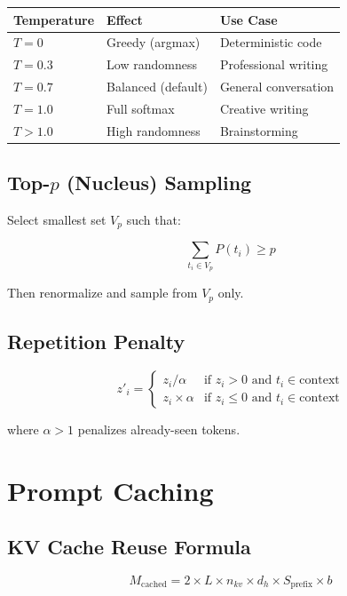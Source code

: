 \documentclass[11pt,a4paper]{article}
\begin{document}
\begin{center}
\begin{tabular}{lll}
\toprule
\textbf{Temperature} & \textbf{Effect} & \textbf{Use Case} \\
\midrule
$T = 0$ & Greedy (argmax) & Deterministic code \\
$T = 0.3$ & Low randomness & Professional writing \\
$T = 0.7$ & Balanced (default) & General conversation \\
$T = 1.0$ & Full softmax & Creative writing \\
$T > 1.0$ & High randomness & Brainstorming \\
\bottomrule
\end{tabular}
\end{center}

\subsection{Top-$p$ (Nucleus) Sampling}

Select smallest set $V_p$ such that:

$$\sum_{t_i \in V_p} P(t_i) \geq p$$

Then renormalize and sample from $V_p$ only.

\subsection{Repetition Penalty}

$$z'_i = \begin{cases} z_i / \alpha & \text{if } z_i > 0 \text{ and } t_i \in \text{context} \\ z_i \times \alpha & \text{if } z_i \leq 0 \text{ and } t_i \in \text{context} \end{cases}$$

where $\alpha > 1$ penalizes already-seen tokens.

\section{Prompt Caching}

\subsection{KV Cache Reuse Formula}

$$M_{\text{cached}} = 2 \times L \times n_{kv} \times d_h \times S_{\text{prefix}} \times b$$
\end{document}
